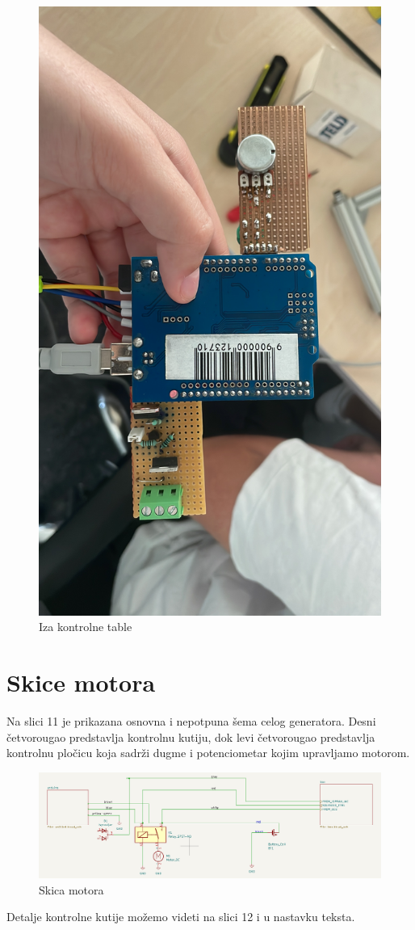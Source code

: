 \documentclass[a4paper, 11pt, titlepage]{article}
\begin{document}
\begin{figure}[htbp]
\begin{minipage}[b]{0.3\textwidth}
    \includegraphics[angle = 270, width=0.75\linewidth]{backside.jpeg}
    \caption{Iza kontrolne table}
  \end{minipage}
\end{figure}


\newpage
\section{Skice motora}

Na slici 11 je prikazana osnovna i nepotpuna šema celog generatora. Desni četvorougao predstavlja kontrolnu kutiju, dok levi četvorougao predstavlja kontrolnu pločicu koja sadrži dugme i potenciometar kojim upravljamo motorom. 




\begin{figure}[htbp]
    \centering
    \includegraphics[width=1\linewidth]{skica_motor.png}
    \caption{Skica motora}
\end{figure}
Detalje kontrolne kutije možemo videti na slici 12 i u nastavku teksta. 
\end{document}
